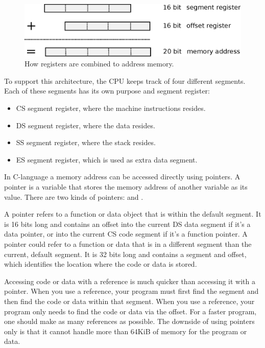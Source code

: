 \documentclass[book.tex]{subfiles}
\begin{document}
\par
\begin{figure}[H]
\centering
\includegraphics[width=\textwidth]{imgs/drawings/register_combination_20_bits_address.eps}
\caption{How registers are combined to address memory.}
\label{fig:register_comb_to_20_bits}
\end{figure}
\par

To support this architecture, the CPU keeps track of four different segments. Each of these segments has its own purpose and segment register:
\begin{itemize}
  \item CS segment register, where the machine instructions resides.
  \item DS segment register, where the data resides.
  \item SS segment register, where the stack resides.
  \item ES segment register, which is used as extra data segment.
\end{itemize}

\par
In C-language a memory address can be accessed directly using pointers. A pointer is a variable that stores the memory address of another variable as its value. There are two kinds of pointers:  and . \\

\par
A  pointer refers to a function or data object that is within the default segment. It is 16 bits long and contains an offset into the current DS data segment if it's a data pointer, or into the current CS code segment if it's a function pointer. A  pointer could refer to a function or data that is in a different segment than the current, default segment. It is 32 bits long and contains a segment and offset, which identifies the location where the code or data is stored. \\

\par
Accessing code or data with a  reference is much quicker than accessing it with a  pointer. When you use a  reference, your program must first find the segment and then find the code or data within that segment. When you use a  reference, your program only needs to find the code or data via the offset. For a faster program, one should make as many  references as possible. The downside of using  pointers only is that it cannot handle more than 64KiB of memory for the program or data.\\
\end{document}
